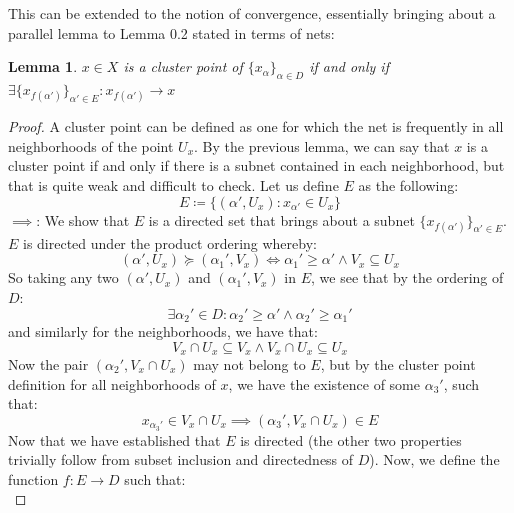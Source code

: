 \documentclass[10pt,letterpaper]{article} %
\newtheorem{lem}{Lemma}[section]
\begin{document}
This can be extended to the notion of convergence, essentially bringing about a parallel lemma to Lemma 0.2 stated in terms of nets:
\begin{lem}
$x \in X$ is a cluster point of $\{x_\alpha\}_{\alpha \in D}$ if and only if $\exists \{x_{f(\alpha')}\}_{\alpha' \in E}: x_{f(\alpha')} \xrightarrow{} x$
\end{lem}
\begin{proof}
A cluster point can be defined as one for which the net is frequently in all neighborhoods of the point $U_x$. By the previous lemma, we can say that $x$ is a cluster point if and only if there is a subnet contained in each neighborhood, but that is quite weak and difficult to check. Let us define $E$ as the following:
\begin{equation*}
E \coloneq \{(\alpha', U_x) : x_{\alpha'} \in U_x\}
\end{equation*}
$\implies$: We show that $E$ is a directed set that brings about a subnet $\{x_{f(\alpha')}\}_{\alpha' \in E}$. $E$ is directed under the product ordering whereby:
\begin{equation*}
(\alpha', U_x) \succcurlyeq (\alpha_1', V_x) \iff \alpha_1' \geq \alpha' \land V_x \subseteq U_x
\end{equation*}
So taking any two $(\alpha', U_x)$ and $(\alpha_1', V_x)$ in $E$, we see that by the ordering of $D$:
\begin{equation*}
\exists \alpha_2' \in D: \alpha_2' \geq \alpha' \land \alpha_2' \geq \alpha_1'
\end{equation*}
and similarly for the neighborhoods, we have that:
\begin{equation*}
V_x \cap U_x \subseteq V_x \land V_x \cap U_x \subseteq U_x
\end{equation*}
Now the pair $(\alpha_2', V_x \cap U_x)$ may not belong to $E$, but by the cluster point definition for all neighborhoods of $x$, we have the existence of some $\alpha_3'$, such that:
\begin{equation*}
x_{\alpha_3'} \in V_x \cap U_x \implies (\alpha_3', V_x \cap U_x) \in E
\end{equation*}
Now that we have established that $E$ is directed (the other two properties trivially follow from subset inclusion and directedness of $D$). Now, we define the function $f: E \xrightarrow{} D$ such that:
\begin{equation*}

\end{equation*}
\end{proof}
\end{document}

